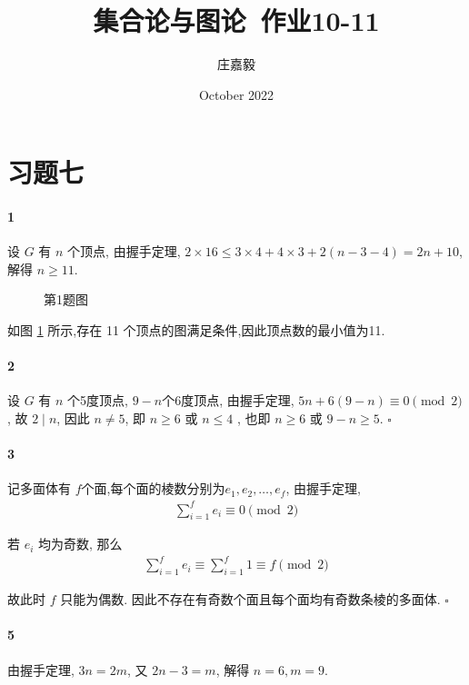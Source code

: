 \documentclass{ctexart}
\title{集合论与图论~作业10-11}
\author{庄嘉毅}
\date{October 2022}
\def\QED{\hfill $\square$}
\begin{document}
\maketitle

\section*{习题七}

\paragraph*{1} 设 $G$ 有 $n$ 个顶点, 由握手定理,
$2\times 16\le 3\times 4+4\times 3 + 2(n-3-4)=2n+10$,
解得 $n\ge 11$.

\begin{figure}[ht]
    \centering
    \caption{第1题图}
    \label{fig:1}
\end{figure}

如图 \ref{fig:1} 所示,存在 11 个顶点的图满足条件,因此顶点数的最小值为11.

\paragraph*{2} 设 $G$ 有 $n$ 个5度顶点, $9-n$个6度顶点, 由握手定理,
$5n+6(9-n)\equiv 0\pmod 2$, 故 $2\mid n$, 因此 $n\ne 5$,
即 $n\ge 6$ 或 $n\le 4$ , 也即 $n\ge 6$ 或 $9-n\ge 5$. \QED


\paragraph*{3} 记多面体有 $f$个面,每个面的棱数分别为$e_1,e_2,\ldots,e_f$,
由握手定理,
\begin{gather*}
    \sum_{i=1}^f e_i \equiv 0 \pmod 2
\end{gather*}

若 $e_i$ 均为奇数, 那么
\begin{gather*}
    \sum_{i=1}^f e_i \equiv \sum_{i=1}^f 1 \equiv f \pmod 2
\end{gather*}

故此时 $f$ 只能为偶数. 因此不存在有奇数个面且每个面均有奇数条棱的多面体. \QED

\paragraph*{5} 由握手定理, $3n=2m$, 又 $2n-3=m$, 解得 $n=6,m=9$.
\end{document}
